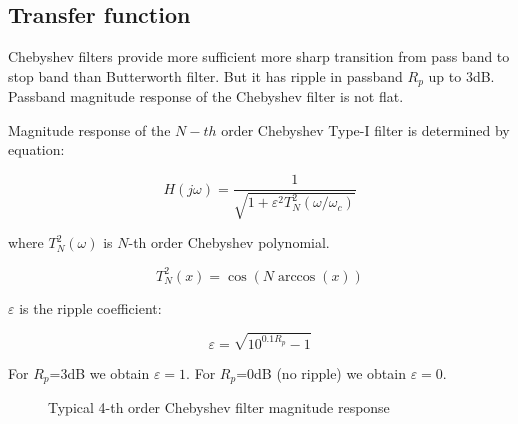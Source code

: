 \subsection{Transfer function}

Chebyshev filters provide more sufficient more sharp transition from pass band
to stop band than Butterworth filter. But it has ripple in passband $R_p$ up to
3dB.
Passband magnitude response of the Chebyshev filter is not flat. 

Magnitude response of the $N-th$ order Chebyshev Type-I filter is determined by
equation:

\begin{equation}
 H(j\omega) = \frac{1}{\sqrt{1+\varepsilon^2 T^2_N(\omega/\omega_c)}}
\end{equation}

where $T^2_N(\omega)$ is $N$-th order Chebyshev polynomial.

\begin{equation}
 T^2_N(x) = \cos(N\arccos(x)) \label{cheb-poly}
\end{equation}

$\varepsilon$ is the ripple coefficient:

\begin{equation}
 \varepsilon = \sqrt{10^{0.1R_p}-1} \label{eps}
\end{equation}

For $R_p$=3dB we obtain $\varepsilon=1$. For $R_p$=0dB (no ripple) we obtain
$\varepsilon=0$. 


\begin{figure}[!ht]
  \centering
  \caption{Typical 4-th order Chebyshev filter magnitude response}
  \label{fig:cheb}
\end{figure}

